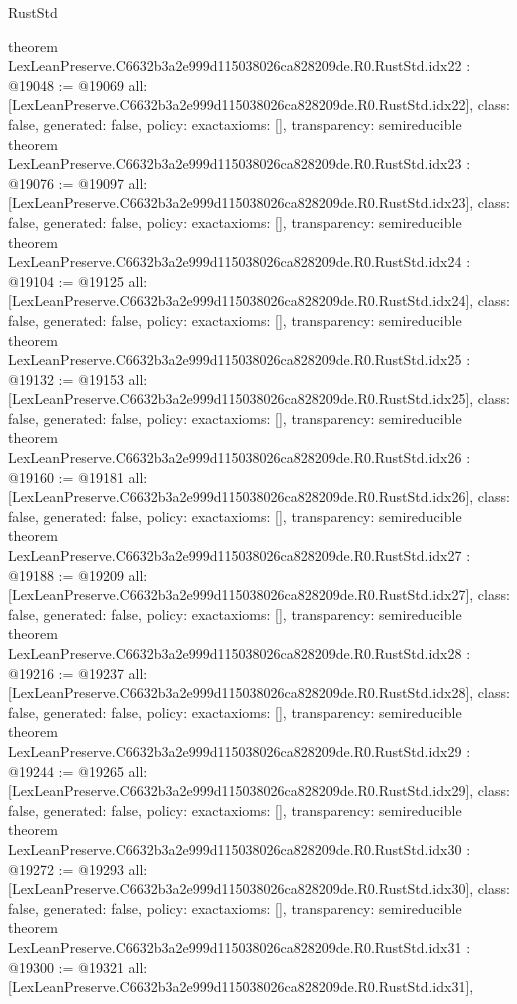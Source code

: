 \begin{lexlean}{RustStd}
\begin{coremodule}
{}
theorem LexLeanPreserve.C6632b3a2e999d115038026ca828209de.R0.RustStd.idx22 : @19048 := @19069 {
  all: [LexLeanPreserve.C6632b3a2e999d115038026ca828209de.R0.RustStd.idx22],
  class: false,
  generated: false,
  policy: exact{axioms: []},
  transparency: semireducible
}
theorem LexLeanPreserve.C6632b3a2e999d115038026ca828209de.R0.RustStd.idx23 : @19076 := @19097 {
  all: [LexLeanPreserve.C6632b3a2e999d115038026ca828209de.R0.RustStd.idx23],
  class: false,
  generated: false,
  policy: exact{axioms: []},
  transparency: semireducible
}
theorem LexLeanPreserve.C6632b3a2e999d115038026ca828209de.R0.RustStd.idx24 : @19104 := @19125 {
  all: [LexLeanPreserve.C6632b3a2e999d115038026ca828209de.R0.RustStd.idx24],
  class: false,
  generated: false,
  policy: exact{axioms: []},
  transparency: semireducible
}
theorem LexLeanPreserve.C6632b3a2e999d115038026ca828209de.R0.RustStd.idx25 : @19132 := @19153 {
  all: [LexLeanPreserve.C6632b3a2e999d115038026ca828209de.R0.RustStd.idx25],
  class: false,
  generated: false,
  policy: exact{axioms: []},
  transparency: semireducible
}
theorem LexLeanPreserve.C6632b3a2e999d115038026ca828209de.R0.RustStd.idx26 : @19160 := @19181 {
  all: [LexLeanPreserve.C6632b3a2e999d115038026ca828209de.R0.RustStd.idx26],
  class: false,
  generated: false,
  policy: exact{axioms: []},
  transparency: semireducible
}
theorem LexLeanPreserve.C6632b3a2e999d115038026ca828209de.R0.RustStd.idx27 : @19188 := @19209 {
  all: [LexLeanPreserve.C6632b3a2e999d115038026ca828209de.R0.RustStd.idx27],
  class: false,
  generated: false,
  policy: exact{axioms: []},
  transparency: semireducible
}
theorem LexLeanPreserve.C6632b3a2e999d115038026ca828209de.R0.RustStd.idx28 : @19216 := @19237 {
  all: [LexLeanPreserve.C6632b3a2e999d115038026ca828209de.R0.RustStd.idx28],
  class: false,
  generated: false,
  policy: exact{axioms: []},
  transparency: semireducible
}
theorem LexLeanPreserve.C6632b3a2e999d115038026ca828209de.R0.RustStd.idx29 : @19244 := @19265 {
  all: [LexLeanPreserve.C6632b3a2e999d115038026ca828209de.R0.RustStd.idx29],
  class: false,
  generated: false,
  policy: exact{axioms: []},
  transparency: semireducible
}
theorem LexLeanPreserve.C6632b3a2e999d115038026ca828209de.R0.RustStd.idx30 : @19272 := @19293 {
  all: [LexLeanPreserve.C6632b3a2e999d115038026ca828209de.R0.RustStd.idx30],
  class: false,
  generated: false,
  policy: exact{axioms: []},
  transparency: semireducible
}
theorem LexLeanPreserve.C6632b3a2e999d115038026ca828209de.R0.RustStd.idx31 : @19300 := @19321 {
  all: [LexLeanPreserve.C6632b3a2e999d115038026ca828209de.R0.RustStd.idx31],
}
\end{coremodule}
\end{lexlean}
